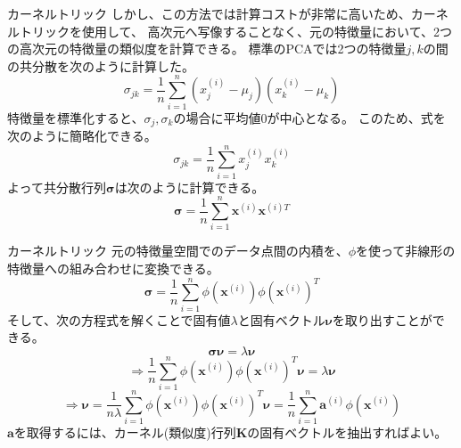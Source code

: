 \documentclass[aspectratio=169, dvipdfmx, 11pt]{beamer} %
\begin{document}
\begin{frame}{カーネルトリック}
    しかし、この方法では計算コストが非常に高いため、カーネルトリックを使用して、
    高次元へ写像することなく、元の特徴量において、2つの高次元の特徴量の類似度を計算できる。
    標準のPCAでは2つの特徴量\(j,k\)の間の共分散を次のように計算した。
    \begin{equation*}
        \sigma_{jk} = \frac{1}{n} \sum_{i=1}^{n} (x_{j}^{(i)} - \mu_j) (x_{k}^{(i)} - \mu_k)
    \end{equation*}
    特徴量を標準化すると、\(\sigma_j, \sigma_k\)の場合に平均値0が中心となる。
    このため、式を次のように簡略化できる。
    \begin{equation*}
        \sigma_{jk} = \frac{1}{n} \sum_{i=1}^{n} x_{j}^{(i)} x_{k}^{(i)}
    \end{equation*}
    よって共分散行列\(\bm{\sigma}\)は次のように計算できる。
    \begin{equation*}
        \bm{\sigma} = \frac{1}{n} \sum_{i=1}^{n} \bm{x}^{(i)} \bm{x}^{(i)T}
    \end{equation*}
\end{frame}

\begin{frame}{カーネルトリック}
    元の特徴量空間でのデータ点間の内積を、\(\phi\)を使って非線形の特徴量への組み合わせに変換できる。
    \begin{equation*}
        \bm{\sigma} = \frac{1}{n} \sum_{i=1}^{n} \phi(\bm{x}^{(i)}) \phi(\bm{x}^{(i)})^T
    \end{equation*}
    そして、次の方程式を解くことで固有値\(\lambda\)と固有ベクトル\(\bm{\nu}\)を取り出すことができる。\\
    \begin{equation*}
        \bm{\sigma} \bm{\nu}  = \lambda \bm{\nu} 
    \end{equation*}
    \begin{equation*}
        \Rightarrow \frac{1}{n} \sum_{i=1}^{n} \phi(\bm{x}^{(i)}) \phi(\bm{x}^{(i)})^T \bm{\nu}  = \lambda \bm{\nu} 
    \end{equation*}
    \begin{equation*}
        \Rightarrow \bm{\nu} = \frac{1}{n \lambda} \sum_{i=1}^{n} \phi(\bm{x}^{(i)}) \phi(\bm{x}^{(i)})^T \bm{\nu}
        = \frac{1}{n} \sum_{i=1}^{n} \bm{a}^{(i)} \phi(\bm{x}^{(i)})
    \end{equation*}
    \(\bm{a}\)を取得するには、カーネル(類似度)行列\(\bm{K}\)の固有ベクトルを抽出すればよい。
\end{frame}
\end{document}
